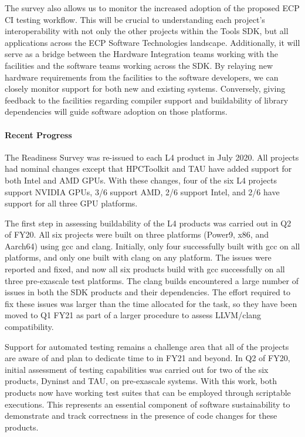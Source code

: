 The survey also allows us to monitor the increased adoption of the proposed ECP CI testing workflow. This will be crucial to understanding each project’s interoperability with not only the other projects within the Tools SDK, but all applications across the ECP Software Technologies landscape. Additionally, it will serve as a bridge between the Hardware Integration teams working with the facilities and the software teams working across the SDK. By relaying new hardware requirements from the facilities to the software developers, we can closely monitor support for both new and existing systems. Conversely, giving feedback to the facilities regarding compiler support and buildability of library dependencies will guide software adoption on those platforms.

\paragraph{Recent Progress}
The Readiness Survey was re-issued to each L4 product in July 2020. All projects had nominal changes except that HPCToolkit and TAU have added support for both Intel and AMD GPUs. With these changes,  four of the six L4 projects support NVIDIA GPUs, 3/6 support AMD, 2/6 support Intel, and 2/6 have support for all three GPU platforms.

The first step in assessing buildability of the L4 products was carried out in Q2 of FY20. All six projects were built on three platforms (Power9, x86, and Aarch64) using gcc and clang. Initially, only four successfully built with gcc on all platforms, and only one built with clang on any platform. The issues were reported and fixed, and now all six products build with gcc successfully on all three pre-exascale test platforms. The clang builds encountered a large number of issues in both the SDK products and their dependencies. The effort required to fix these issues was larger than the time allocated for the task, so they have been moved to Q1 FY21 as part of a larger procedure to assess LLVM/clang compatibility.

Support for automated testing remains a challenge area that all of the projects are aware of and plan to dedicate time to in FY21 and beyond. In Q2 of FY20, initial assessment of testing capabilities was carried out for two of the six products, Dyninst and TAU, on pre-exascale systems. With this work, both products now have working test suites that can be employed through scriptable executions. This represents an essential component of software sustainability to demonstrate and track correctness in the presence of code changes for these products.


